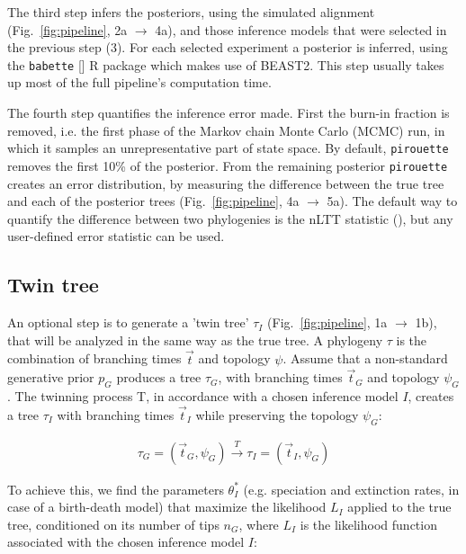 The third step infers the posteriors,
using the simulated alignment (Fig.~\ref{fig:pipeline}, 2a $\rightarrow$ 4a),
and those inference models that were selected in the previous step (3). 
For each selected experiment a posterior is inferred, using the 
\verb;babette; [\cite{bilderbeek2018babette}] R package which makes use of BEAST2. 
This step usually takes up most of the full pipeline's computation time.

The fourth step quantifies the inference error made. First the 
burn-in fraction is removed, i.e. the first phase of the Markov chain Monte Carlo (MCMC) run,
in which it samples an unrepresentative part of state space. By default, \verb;pirouette; 
removes the first 10\% of the posterior.
From the remaining posterior \verb;pirouette; 
creates an error distribution, by measuring the difference
between the true tree and each of the posterior 
trees (Fig.~\ref{fig:pipeline}, 4a $\rightarrow$ 5a).
The default way to quantify the difference between two phylogenies
is the nLTT statistic (\cite{janzen2015approximate}), but any 
user-defined error statistic can be used.

\subsection{Twin tree}\label{subsec:twinning}

An optional step is to generate a 'twin tree' $\tau_{I}$
(Fig.~\ref{fig:pipeline}, 1a $\rightarrow$ 1b),
that will be analyzed in the same way as the true tree.
A phylogeny $\tau$ is the combination of 
branching times $\Vec{t}$ and topology $\psi$.
Assume that a non-standard generative prior $\mathit{p_{G}}$
produces a tree $\tau_{\mathit{G}}$,
with branching times $\Vec{t}_{\mathit{G}}$ and 
topology $\psi_{\mathit{G}}$.
The twinning process T, in accordance with a chosen inference 
model $\mathit{I}$, creates a tree $\tau_{\mathit{I}}$
with branching times $\Vec{t}_{\mathit{I}}$ while preserving the 
topology $\psi_{\mathit{G}}$:

\begin{align}
  \tau_{\mathit{G}} = (\Vec{t}_{\mathit{G}}, \psi_{\mathit{G}}) 
  \xrightarrow[]{\mathit{T}} 
  \tau_{\mathit{I}} = (\Vec{t}_{\mathit{I}}, \psi_{\mathit{G}})
\end{align}

To achieve this, we find the parameters $\theta^{*}_{\mathit{I}}$ 
(e.g. speciation and extinction rates, in case of a birth-death model) 
that maximize the likelihood $L_{\mathit{I}}$ applied 
to the true tree, conditioned on its number of tips $n_{\mathit{G}}$,
where $L_{\mathit{I}}$ is the likelihood function  
associated with the chosen inference model $\mathit{I}$:

